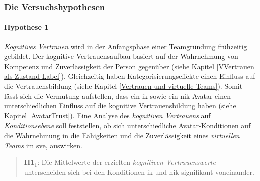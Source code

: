 \documentclass[a4paper,11pt]{article}%
\renewcommand{\\}{\vspace*{0.5\baselineskip} \newline}
\begin{document}
{\subsubsection{Die Versuchshypothesen}
\label{VersuchshypothesenAuflistung}

\paragraph{Hypothese 1}
\textit{Kognitives Vertrauen} wird in der Anfangsphase einer Teamgründung frühzeitig gebildet.
Der kognitive Vertrauensaufbau basiert auf der Wahrnehmung von Kompetenz und Zuverlässigkeit der Person gegenüber (siehe Kapitel \ref{VVertrauen als Zustand-Label}). Gleichzeitig haben Kategorisierungseffekte einen Einfluss auf die Vertrauensbildung (siehe Kapitel \ref{Vertrauen und virtuelle Teams}). Somit lässt sich die Vermutung aufstellen, dass ein \ac{ik} sowie ein \ac{nik} Avatar einen unterschiedlichen Einfluss auf die kognitive Vertrauensbildung haben (siehe Kapitel \ref{AvatarTrust}).
Eine Analyse des \textit{kognitiven Vertrauens} auf \textit{Konditionsebene} soll feststellen, ob sich unterschiedliche Avatar-Konditionen auf die Wahrnehmung in die Fähigkeiten und die Zuverlässigkeit eines \textit{virtuellen Teams} im \ac{sve}, auswirken.\newline
\begin{quote}
\textbf{H1$_{1}$}: Die Mittelwerte der erzielten \textit{kognitiven Vertrauenswerte} unterscheiden sich bei den Konditionen \ac{ik} und \ac{nik} signifikant voneinander.
\end{quote}

}
\end{document}
